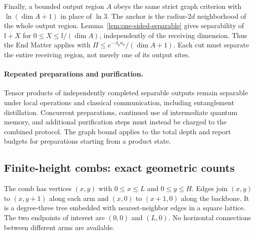 \documentclass[aps,prl,twocolumn,superscriptaddress,longbibliography,reprint,floatfix]{revtex4-2}
\newcommand{\Id}{\mathbb I}
\begin{document}
Finally, a bounded output region $A$ obeys the same
strict graph criterion with $\ln(\dim A+1)$ in place of $\ln3$.
The anchor is the radius-$2d$ neighborhood of the whole output region.
Lemma~\ref{lem:one-sided-separable} gives separability of
$\Id+X$ for $0\le X\le\Id/(\dim A)$, independently of the receiving
dimension. Thus the End Matter applies with
$\Pi\le e^{-\Lambda_p n_0}/(\dim A+1)$. Each cut must separate the entire
receiving region, not merely one of its output sites.

\paragraph*{Repeated preparations and purification.}
Tensor products of independently completed separable outputs remain
separable under local operations and classical communication, including
entanglement distillation. Concurrent preparations, continued use of
intermediate quantum memory, and additional purification steps must
instead be charged to the combined protocol. The graph bound applies to the total depth and report budgets for
preparations starting from a product state.

\subsection{Finite-height combs: exact geometric counts}
\label{sec:comb-proof}

The comb has vertices $(x,y)$ with $0\le x\le L$ and $0\le y\le H$.
Edges join $(x,y)$ to $(x,y+1)$ along each arm and $(x,0)$ to
$(x+1,0)$ along the backbone.  It is a degree-three tree embedded
with nearest-neighbor edges in a square lattice.  The two endpoints
of interest are $(0,0)$ and $(L,0)$.
No horizontal connections between different arms are available.
\end{document}
